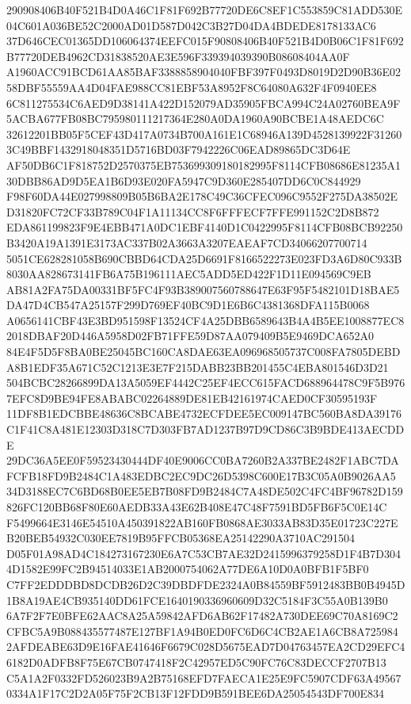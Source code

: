 \documentclass[UTF8,fontset=fandol,zihao=-4,a4paper]{ctexart}
\begin{document}
{{290908406B40F521B4D0A46C1F81F692B77720DE6C8EF1C553859C81ADD530E04C601A036BE52C2000AD01D587D042C3B27D04DA4BDEDE8178133AC6
37D646CEC01365DD106064374EEFC015F90808406B40F521B4D0B06C1F81F692B77720DEB4962CD31838520AE3E596F339394039390B08608404AA0F
A1960ACC91BCD61AA85BAF3388858904040FBF397F0493D8019D2D90B36E0258DBF55559AA4D04FAE988CC81EBF53A8952F8C64080A632F4F0940EE8
6C811275534C6AED9D38141A422D152079AD35905FBCA994C24A02760BEA9F5ACBA677FB08BC795980111217364E280A0DA1960A90BCBE1A48AEDC6C
32612201BB05F5CEF43D417A0734B700A161E1C68946A139D4528139922F312603C49BBF1432918048351D5716BD03F7942226C06EAD89865DC3D64E
AF50DB6C1F818752D2570375EB753699309180182995F8114CFB08686E81235A130DBB86AD9D5EA1B6D93E020FA5947C9D360E285407DD6C0C844929
F98F60DA44E027998809B05B6BA2E178C49C36CFEC096C9552F275DA38502ED31820FC72CF33B789C04F1A11134CC8F6FFFECF7FFE991152C2D8B872
EDA861199823F9E4EBB471A0DC1EBF4140D1C0422995F8114CFB08BCB92250B3420A19A1391E3173AC337B02A3663A3207EAEAF7CD34066207700714
5051CE628281058B690CBBD64CDA25D6691F8166522273E023FD3A6D80C933B8030AA828673141FB6A75B196111AEC5ADD5ED422F1D11E094569C9EB
AB81A2FA75DA00331BF5FC4F93B389007560788647E63F95F5482101D18BAE5DA47D4CB547A25157F299D769EF40BC9D1E6B6C4381368DFA115B0068
A0656141CBF43E3BD951598F13524CF4A25DBB6589643B4A4B5EE1008877EC82018DBAF20D446A5958D02FB71FFE59D87AA079409B5E9469DCA652A0
84E4F5D5F8BA0BE25045BC160CA8DAE63EA096968505737C008FA7805DEBDA8B1EDF35A671C52C1213E3E7F215DABB23BB201455C4EBA801546D3D21
504BCBC28266899DA13A5059EF4442C25EF4ECC615FACD688964478C9F5B9767EFC8D9BE94FE8ABABC02264889DE81EB42161974CAED0CF30595193F
11DF8B1EDCBBE48636C8BCABE4732ECFDEE5EC009147BC560BA8DA39176C1F41C8A481E12303D318C7D303FB7AD1237B97D9CD86C3B9BDE413AECDDE
29DC36A5EE0F59523430444DF40E9006CC0BA7260B2A337BE2482F1ABC7DAFCFB18FD9B2484C1A483EDBC2EC9DC26D5398C600E17B3C05A0B9026AA5
34D3188EC7C6BD68B0EE5EB7B08FD9B2484C7A48DE502C4FC4BF96782D159826FC120BB68F80E60AEDB33A43E62B408E47C48F7591BD5FB6F5C0E14C
F5499664E3146E54510A450391822AB160FB0868AE3033AB83D35E01723C227EB20BEB54932C030EE7819B95FFCB05368EA25142290A3710AC291504
D05F01A98AD4C184273167230E6A7C53CB7AE32D2415996379258D1F4B7D3044D1582E99FC2B94514033E1AB2000754062A77DE6A10D0A0BFB1F5BF0
C7FF2EDDDBD8DCDB26D2C39DBDFDE2324A0B84559BF5912483BB0B4945D1B8A19AE4CB935140DD61FCE1640190336960609D32C5184F3C55A0B139B0
6A7F2F7E0BFE62AAC8A25A59842AFD6AB62F17482A730DEE69C70A8169C2CFBC5A9B088435577487E127BF1A94B0ED0FC6D6C4CB2AE1A6CB8A725984
2AFDEABE63D9E16FAE41646F6679C028D5675EAD7D04763457EA2CD29EFC46182D0ADFB8F75E67CB0747418F2C42957ED5C90FC76C83DECCF2707B13
C5A1A2F0332FD526023B9A2B75168EFD7FAECA1E25E9FC5907CDF63A495670334A1F17C2D2A05F75F2CB13F12FDD9B591BEE6DA25054543DF700E834
}}
\end{document}
